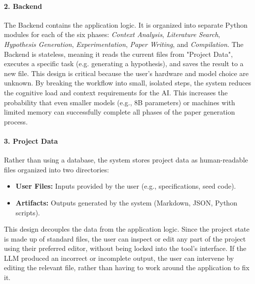 \paragraph{2. Backend}
The Backend contains the application logic. It is organized into separate Python modules for each of the six phases: \textit{Context Analysis}, 
\textit{Literature Search}, \textit{Hypothesis Generation}, \textit{Experimentation}, \textit{Paper Writing}, and \textit{Compilation}.
The Backend is stateless, meaning it reads the current files from "Project Data", executes a specific task (e.g. generating a hypothesis), and saves the result to a new file. 
This design is critical because the user's hardware and model choice are unknown. 
By breaking the workflow into small, isolated steps, the system reduces the cognitive load and context requirements for the AI. 
This increases the probability that even smaller models (e.g., 8B parameters) or machines with limited memory can successfully complete 
all phases of the paper generation process.


\paragraph{3. Project Data}
Rather than using a database, the system stores project data as human-readable files organized into two directories:
\begin{itemize}
    \item \textbf{User Files:} Inputs provided by the user (e.g., specifications, seed code).
    \item \textbf{Artifacts:} Outputs generated by the system (Markdown, JSON, Python scripts).
\end{itemize}
This design decouples the data from the application logic. Since the project state is made up of standard files, the user can inspect 
or edit any part of the project using their preferred editor, without being locked into the tool's interface. 
If the LLM produced an incorrect or incomplete output, the user can intervene by editing the relevant file, 
rather than having to work around the application to fix it.


